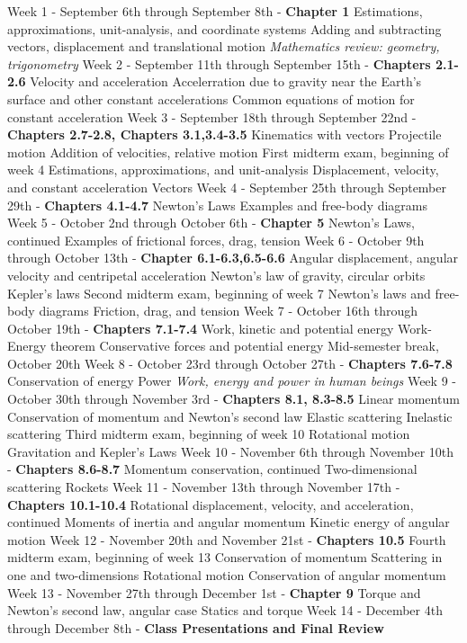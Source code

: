 \documentclass[10pt]{article}
\begin{document}
\begin{outline}[enumerate]
\1 Week 1 - September 6th through September 8th - \textbf{Chapter 1}
\2 Estimations, approximations, unit-analysis, and coordinate systems
\2 Adding and subtracting vectors, displacement and translational motion
\2 \textit{Mathematics review: geometry, trigonometry}
\1 Week 2 - September 11th through September 15th - \textbf{Chapters 2.1-2.6}
\2 Velocity and acceleration
\2 Accelerration due to gravity near the Earth's surface and other constant accelerations
\2 Common equations of motion for constant acceleration
\1 Week 3 - September 18th through September 22nd - \textbf{Chapters 2.7-2.8, Chapters 3.1,3.4-3.5}
\2 Kinematics with vectors
\2 Projectile motion
\2 Addition of velocities, relative motion
\1 First midterm exam, beginning of week 4
\2 Estimations, approximations, and unit-analysis
\2 Displacement, velocity, and constant acceleration
\2 Vectors
\1 Week 4 - September 25th through September 29th - \textbf{Chapters 4.1-4.7}
\2 Newton's Laws
\2 Examples and free-body diagrams
\1 Week 5 - October 2nd through October 6th - \textbf{Chapter 5}
\2 Newton's Laws, continued
\2 Examples of frictional forces, drag, tension
\1 Week 6 - October 9th through October 13th - \textbf{Chapter 6.1-6.3,6.5-6.6}
\2 Angular displacement, angular velocity and centripetal acceleration
\2 Newton's law of gravity, circular orbits
\2 Kepler's laws
\1 Second midterm exam, beginning of week 7
\2 Newton's laws and free-body diagrams
\2 Friction, drag, and tension
\1 Week 7 - October 16th through October 19th - \textbf{Chapters 7.1-7.4}
\2 Work, kinetic and potential energy
\2 Work-Energy theorem
\2 Conservative forces and potential energy
\1 Mid-semester break, October 20th
\1 Week 8 - October 23rd through October 27th - \textbf{Chapters 7.6-7.8}
\2 Conservation of energy
\2 Power
\2 \textit{Work, energy and power in human beings}
\1 Week 9 - October 30th through November 3rd - \textbf{Chapters 8.1, 8.3-8.5}
\2 Linear momentum
\2 Conservation of momentum and Newton's second law
\2 Elastic scattering
\2 Inelastic scattering
\1 Third midterm exam, beginning of week 10
\2 Rotational motion
\2 Gravitation and Kepler's Laws
\1 Week 10 - November 6th through November 10th - \textbf{Chapters 8.6-8.7}
\2 Momentum conservation, continued
\2 Two-dimensional scattering
\2 Rockets
\1 Week 11 - November 13th through November 17th - \textbf{Chapters 10.1-10.4}
\2 Rotational displacement, velocity, and acceleration, continued
\2 Moments of inertia and angular momentum
\2 Kinetic energy of angular motion
\1 Week 12 - November 20th and November 21st - \textbf{Chapters 10.5}
\1 Fourth midterm exam, beginning of week 13
\2 Conservation of momentum
\2 Scattering in one and two-dimensions
\2 Rotational motion
\2 Conservation of angular momentum
\1 Week 13 - November 27th through December 1st  - \textbf{Chapter 9}
\2 Torque and Newton's second law, angular case
\2 Statics and torque
\1 Week 14 - December 4th through December 8th - \textbf{Class Presentations and Final Review}
\end{outline}
\end{document}
